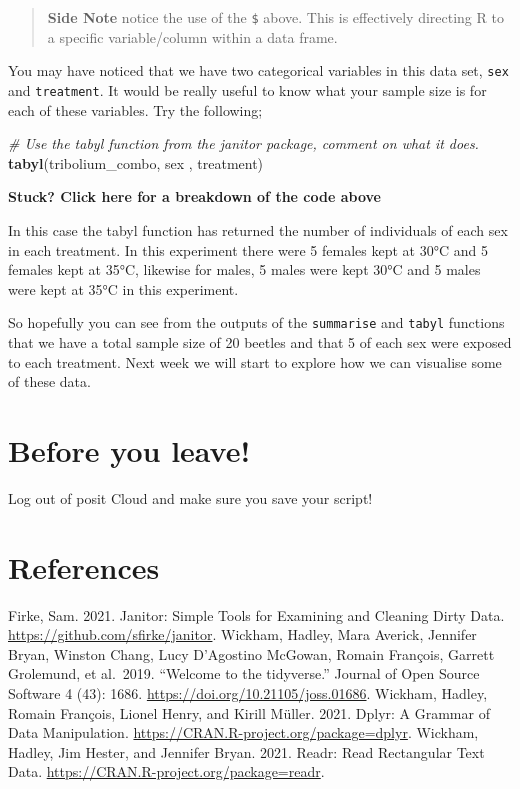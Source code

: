 \documentclass[
]{book}
\newenvironment{Shaded}{\begin{snugshade}}{\end{snugshade}}
\newcommand{\CommentTok}[1]{\textcolor[rgb]{0.56,0.35,0.01}{\textit{#1}}}
\newcommand{\FunctionTok}[1]{\textcolor[rgb]{0.13,0.29,0.53}{\textbf{#1}}}
\newcommand{\NormalTok}[1]{#1}
\begin{document}
\begin{quote}
\textbf{Side Note} notice the use of the \texttt{\$} above. This is effectively directing R to a specific variable/column within a data frame.
\end{quote}

You may have noticed that we have two categorical variables in this data set, \texttt{sex} and \texttt{treatment}. It would be really useful to know what your sample size is for each of these variables. Try the following;

\begin{Shaded}
\begin{Highlighting}[]
\CommentTok{\# Use the tabyl function from the janitor package, comment on what it does. }
\FunctionTok{tabyl}\NormalTok{(tribolium\_combo, sex , treatment)}
\end{Highlighting}
\end{Shaded}

\textbf{Stuck? Click here for a breakdown of the code above}

In this case the tabyl function has returned the number of individuals of each sex in each treatment. In this experiment there were 5 females kept at 30°C and 5 females kept at 35°C, likewise for males, 5 males were kept 30°C and 5 males were kept at 35°C in this experiment.

So hopefully you can see from the outputs of the \texttt{summarise} and \texttt{tabyl} functions that we have a total sample size of 20 beetles and that 5 of each sex were exposed to each treatment. Next week we will start to explore how we can visualise some of these data.

\section{Before you leave!}\label{before-you-leave-1}

Log out of posit Cloud and make sure you save your script!

\section{References}\label{references-2}

Firke, Sam. 2021. Janitor: Simple Tools for Examining and Cleaning Dirty Data. \url{https://github.com/sfirke/janitor}.
Wickham, Hadley, Mara Averick, Jennifer Bryan, Winston Chang, Lucy D'Agostino McGowan, Romain François, Garrett Grolemund, et al.~2019. ``Welcome to the tidyverse.'' Journal of Open Source Software 4 (43): 1686. \url{https://doi.org/10.21105/joss.01686}.
Wickham, Hadley, Romain François, Lionel Henry, and Kirill Müller. 2021. Dplyr: A Grammar of Data Manipulation. \url{https://CRAN.R-project.org/package=dplyr}.
Wickham, Hadley, Jim Hester, and Jennifer Bryan. 2021. Readr: Read Rectangular Text Data. \url{https://CRAN.R-project.org/package=readr}.
\end{document}
